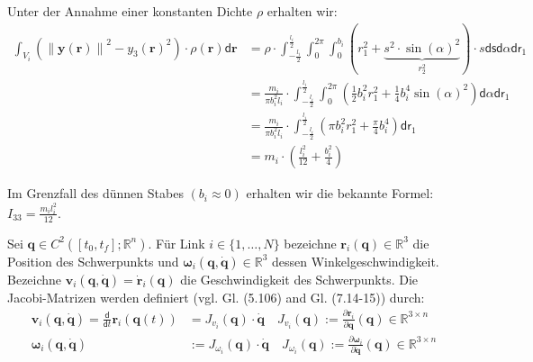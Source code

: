 \documentclass[a4paper, 12pt]{scrartcl}
\newcommand{\norm}[1]{\left\lVert#1\right\lVert}
\begin{document}
\begin{beispiel}
    Unter der Annahme einer konstanten Dichte $\rho$ erhalten wir: 
    \begin{align*}
        \int_{V_i}
        \left(
            \norm{\bm{y}(\bm{r})}^2 - y_3(\bm{r})^2
        \right)
        \cdot
        \rho(\bm{r}) 
        \mathsf{d}\bm{r}
        &=
        \rho
        \cdot
        \int_{-\frac{l_i}{2}}^{\frac{l_i}{2}}
        \int_{0}^{2\pi}
        \int_{0}^{b_i}
            \left(
                r_1^2 
                + 
                \underbrace{
                    s^2 \cdot \sin(\alpha)^2
                }_{r_2^2}
            \right)
        \cdot
        s
        \mathsf{ds}
        \mathsf{d\alpha}
        \mathsf{dr}_1
        \\
        &=
        \frac{m_i}{\pi b_i^2 l_i}
        \cdot
        \int_{-\frac{l_i}{2}}^{\frac{l_i}{2}}
        \int_{0}^{2\pi}
        \left(
            \frac{1}{2} b_i^2 r_1^2 + \frac{1}{4} b_i^4 \sin(\alpha)^2
        \right)
        \mathsf{d\alpha}
        \mathsf{dr}_1
        \\
        &=
        \frac{m_i}{\pi b_i^2 l_i}
        \cdot
        \int_{-\frac{l_i}{2}}^{\frac{l_i}{2}}
        \left(
            \pi b_i^2 r_1^2 + \frac{\pi}{4} b_i^4 
        \right)
        \mathsf{dr}_1
        \\
        &=
        m_i
        \cdot
        \left(
            \frac{l_i^2}{12} + \frac{b_i^2}{4} 
        \right)
    \end{align*}

    Im Grenzfall des dünnen Stabes $(b_i \approx 0)$ erhalten wir die bekannte Formel:
    $I_{33} = \frac{m_i l_i^2}{12}$.
\end{beispiel}

\begin{definition}\label{def:generalisierte_Koordinaten}
    Sei $\bm{q} \in C^2\left([t_0, t_f];\mathbb{R}^n \right)$. Für
    Link $i \in \{1,\dots,N\}$
    bezeichne $\bm{r}_i(\bm{q}) \in \mathbb{R}^3$ die Position des Schwerpunkts
    und $\bm{\omega}_i(\bm{q},\bm{\dot{q}}) \in \mathbb{R}^3$
    dessen Winkelgeschwindigkeit. 
    Bezeichne $\bm{v}_i(\bm{q},\bm{\dot{q}}) = \bm{\dot{r}}_i(\bm{q})$ die 
    Geschwindigkeit des Schwerpunkts. 
    Die Jacobi-Matrizen werden definiert 
    (vgl. \cite{spong2004} Gl. (5.106) and \cite{siciliano2010} Gl. (7.14-15)) durch:
    \begin{align*}
        \bm{v}_i(\bm{q},\bm{\dot{q}})
        =
        \frac{\mathsf{d}}{\mathsf{d}t}\bm{r}_i(\bm{q}(t))
        &= 
        J_{v_i}(\bm{q}) \cdot \bm{\dot{q}}
        \quad
        J_{v_i}(\bm{q})
        := 
        \frac{\partial \bm{r}_i}{\partial \bm{q}}(\bm{q})
        \in \mathbb{R}^{3 \times n}
        \\
        \bm{\omega}_i(\bm{q},\bm{\dot{q}})
        &:=
        J_{\omega_i}(\bm{q}) \cdot \bm{\dot{q}} %
        \quad
        J_{\omega_i}(\bm{q}) 
        :=
        \frac{\partial \bm{\omega}_i}{\partial \bm{\dot{q}}}(\bm{q})
        \in \mathbb{R}^{3 \times n}
    \end{align*}
\end{definition}
\end{document}
